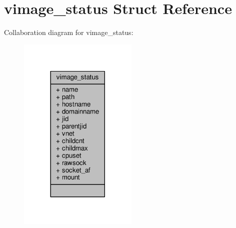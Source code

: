 \hypertarget{structvimage__status}{\section{vimage\+\_\+status Struct Reference}
\label{structvimage__status}
}


Collaboration diagram for vimage\+\_\+status\+:
\nopagebreak
\begin{figure}[H]
\begin{center}
\leavevmode
\includegraphics[width=161pt]{structvimage__status__coll__graph}
\end{center}
\end{figure}
